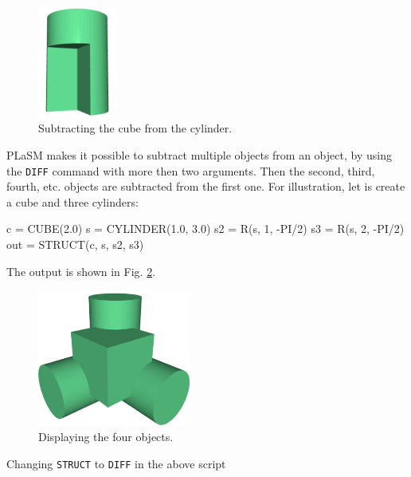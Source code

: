 \begin{figure}[!ht]
\begin{center}
\includegraphics[width=0.23\textwidth]{img/diff-2.png}
\end{center}
\vspace{-4mm}
\caption{Subtracting the cube from the cylinder.}
\label{fig:diff-2}
\end{figure}
\noindent
PLaSM makes it possible to subtract multiple objects from an 
object, by using  the {\tt DIFF} command with more then two arguments.
Then the second, third, fourth, etc. objects are subtracted
from the first one. For illustration, let is create a cube and
three cylinders:

\begin{bluecode}
c = CUBE(2.0)
s = CYLINDER(1.0, 3.0)
s2 = R(s, 1, -PI/2)
s3 = R(s, 2, -PI/2)
out = STRUCT(c, s, s2, s3) 
\end{bluecode}
The output is shown in Fig. \ref{fig:diff-3}.
\newpage

\begin{figure}[!ht]
\begin{center}
\includegraphics[width=0.45\textwidth]{img/diff-3.png}
\end{center}
\vspace{-4mm}
\caption{Displaying the four objects.}
\label{fig:diff-3}
\end{figure}
\noindent
Changing {\tt STRUCT} to {\tt DIFF} in the above script

